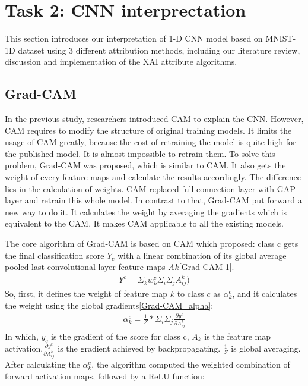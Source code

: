 \documentclass[conference]{IEEEtran}
\begin{document}
\section{Task 2: CNN interprectation}

This section introduces our interpretation of 1-D CNN model based on MNIST-1D dataset using 3 different attribution methods, including our literature review, discussion and implementation of the XAI attribute algorithms.

\subsection{Grad-CAM}
In the previous study, researchers introduced CAM to explain the CNN. However, CAM requires to modify the structure of original training models. It limits the usage of CAM greatly, because the cost of retraining the model is quite high for the published model. It is almost impossible to retrain them.
To solve this problem, Grad-CAM was proposed, which is similar to CAM. It also gets the weight of every feature maps and calculate the results accordingly. The difference lies in the calculation of weights. CAM replaced full-connection layer with GAP layer and retrain this whole model. In contrast to that, Grad-CAM put forward a new way to do it.
It calculates the weight by averaging the gradients which is equivalent to the CAM. It makes CAM applicable to all the existing models.\par

The core algorithm of Grad-CAM is based on CAM which proposed: class c gets the final classification score $Y_{c}$ with a linear combination of its global average pooled last convolutional layer feature maps $A_{}k$\ref{Grad-CAM-1}.
\begin{equation}
\begin{aligned}
    Y^{c}=\Sigma_{k}w_{k}^{c}\Sigma_{i}\Sigma_{j}A_{ij}^{k})
    \label{Grad-CAM-1}
\end{aligned}
\end{equation}
So, first, it defines the weight of feature map $k$ to class $c$ as $\alpha_{k}^{c}$, and it calculates the weight using the global gradients\ref{Grad-CAM_alpha}:
\begin{equation}
    \begin{aligned}
        \alpha_{k}^{c}=\frac{1}{Z}*\Sigma_{i}\Sigma_{j}\frac{\partial y^{c}}{\partial A_{ij}^{k}}
        \label{Grad-CAM_alpha}
    \end{aligned}
  \end{equation}
  In which, $y_{c}$ is the gradient of the score for class c, $A_{k}$ is the feature map activation.$\frac{\partial y^{c}}{\partial A_{ij}^{k}}$ is the gradient achieved by backpropagating. $\frac{1}{Z}$ is global averaging.
  After calculating the $\alpha_{k}^{c}$, the algorithm computed the weighted combination of forward activation maps, followed by a ReLU function:
  
\end{document}
